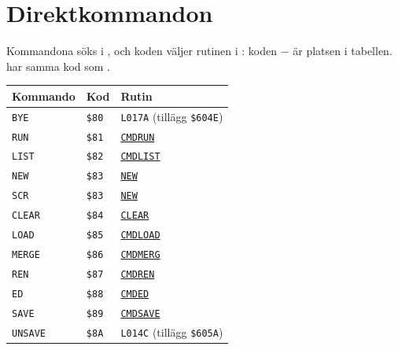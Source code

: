 \section{Direktkommandon}
\noindent Kommandona söks i , och koden
väljer rutinen i : koden $-$  är platsen i
tabellen.  har samma kod som .\par\medskip
\TabNeed{30mm}
\begin{small}\setlength{\LTleft}{0pt}\setlength{\LTright}{\fill}\begin{longtable}{@{}l l l@{}}
\textbf{Kommando} & \textbf{Kod} & \textbf{Rutin}\\\hline\endhead
\texttt{BYE} & \texttt{\$80} & \texttt{L017A} {\footnotesize(tillägg \texttt{\$604E})}\\
\texttt{RUN} & \texttt{\$81} & \hyperlink{l:CMDRUN}{\texttt{CMDRUN}}\\
\texttt{LIST} & \texttt{\$82} & \hyperlink{l:CMDLIST}{\texttt{CMDLIST}}\\
\texttt{NEW} & \texttt{\$83} & \hyperlink{l:NEW}{\texttt{NEW}}\\
\texttt{SCR} & \texttt{\$83} & \hyperlink{l:NEW}{\texttt{NEW}}\\
\texttt{CLEAR} & \texttt{\$84} & \hyperlink{l:CLEAR}{\texttt{CLEAR}}\\
\texttt{LOAD} & \texttt{\$85} & \hyperlink{l:CMDLOAD}{\texttt{CMDLOAD}}\\
\texttt{MERGE} & \texttt{\$86} & \hyperlink{l:CMDMERG}{\texttt{CMDMERG}}\\
\texttt{REN} & \texttt{\$87} & \hyperlink{l:CMDREN}{\texttt{CMDREN}}\\
\texttt{ED} & \texttt{\$88} & \hyperlink{l:CMDED}{\texttt{CMDED}}\\
\texttt{SAVE} & \texttt{\$89} & \hyperlink{l:CMDSAVE}{\texttt{CMDSAVE}}\\
\texttt{UNSAVE} & \texttt{\$8A} & \texttt{L014C} {\footnotesize(tillägg \texttt{\$605A})}\\
\end{longtable}\end{small}
